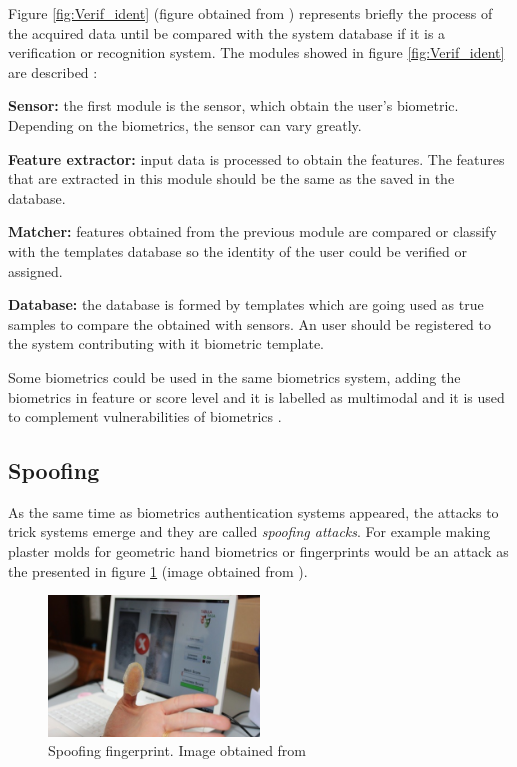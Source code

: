 Figure \ref{fig:Verif_ident} (figure obtained from \cite{Intro_biometrics2}) represents briefly the process of the acquired data until be compared  with the system database if it is a verification or recognition system. The modules showed in figure \ref{fig:Verif_ident} are described \cite{Intro_biometrics2}: 
\begin{description}[noitemsep,topsep=8pt,parsep=0pt,partopsep=20pt]
\item \textbf{Sensor:} the first module is the sensor, which obtain the user's biometric. Depending on the biometrics, the sensor can vary greatly.
\item \textbf{Feature extractor:} input data is processed to obtain the features. The features that are extracted in this module should be the same as the saved in the database.
\item \textbf{Matcher:} features obtained from the previous module are compared or classify with the templates database so the identity of the user could be verified or assigned.
\item \textbf{Database:} the database is formed by templates which are going used as true samples to compare the obtained with sensors. An user should be registered to the system contributing with it biometric template. 
\end{description}

Some biometrics could be used in the same biometrics system, adding the biometrics in feature or score level and it is labelled as multimodal and it is used to complement vulnerabilities of biometrics \cite{Spoofing_survey}.

\subsection{Spoofing}
As the same time as biometrics authentication systems appeared, the attacks to trick systems emerge and they are called \textit{spoofing attacks}. For example making plaster molds for geometric hand biometrics or fingerprints would be an attack as the presented in figure \ref{fig:Spoof_fingerprint} (image obtained from \cite{fingerprint_image}).\\

\begin{figure}[htb]
\centering
\includegraphics[width=0.5\textwidth]{images_miscelaneus/spoofing_fingerprint.jpg}
\caption{Spoofing fingerprint. Image obtained from \cite{fingerprint_image}} \label{fig:Spoof_fingerprint}
\end{figure}


